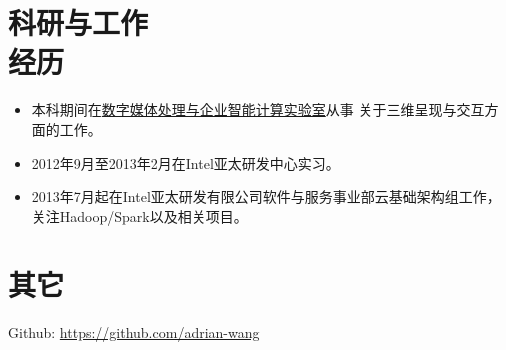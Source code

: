 \documentclass[line,margin]{res}
\begin{document}
\begin{resume}
\section{科研与工作\\经历}
            \begin{itemize}
            \item 本科期间在\href{http://give.zju.edu.cn}{数字媒体处理与企业智能计算实验室}从事
                关于三维呈现与交互方面的工作。
            \item 2012年9月至2013年2月在Intel亚太研发中心实习。
            \item 2013年7月起在Intel亚太研发有限公司软件与服务事业部云基础架构组工作，关注Hadoop/Spark以及相关项目。
            \end{itemize}

\section{其它}
	Github: \href{https://github.com/adrian-wang}{https://github.com/adrian-wang}
\end{resume}
\end{document}
